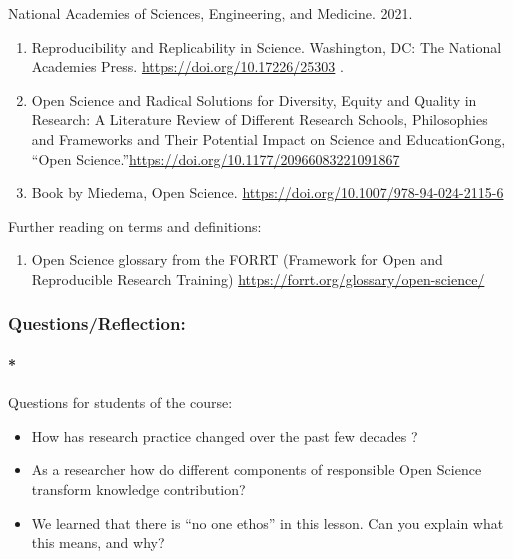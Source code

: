 \documentclass[
  letterpaper,
  DIV=11,
  numbers=noendperiod]{scrreport}
\let\oldparagraph\paragraph
\renewcommand{\paragraph}[1]{\oldparagraph{#1}\mbox{}}
\providecommand{\tightlist}{%
  \setlength{\itemsep}{0pt}\setlength{\parskip}{0pt}}\usepackage{longtable,booktabs,array}
\begin{document}
National Academies of Sciences, Engineering, and Medicine. 2021.

\begin{enumerate}
\def\labelenumi{\arabic{enumi}.}
\tightlist
\item
  Reproducibility and Replicability in Science. Washington, DC: The
  National Academies Press. \url{https://doi.org/10.17226/25303} .
\item
  Open Science and Radical Solutions for Diversity, Equity and Quality
  in Research: A Literature Review of Different Research Schools,
  Philosophies and Frameworks and Their Potential Impact on Science and
  EducationGong, ``Open
  Science.''\url{https://doi.org/10.1177/20966083221091867}
\item
  Book by Miedema, Open Science.
  \url{https://doi.org/10.1007/978-94-024-2115-6}
\end{enumerate}

Further reading on terms and definitions:

\begin{enumerate}
\def\labelenumi{\arabic{enumi}.}
\tightlist
\item
  Open Science glossary from the FORRT (Framework for Open and
  Reproducible Research Training)
  \url{https://forrt.org/glossary/open-science/}
\end{enumerate}

\hypertarget{questionsreflection}{%
\subsubsection*{Questions/Reflection:}\label{questionsreflection}}

\hypertarget{questions-for-students-of-the-course}{%
\paragraph*{Questions for students of the
course:}\label{questions-for-students-of-the-course}}

\begin{itemize}
\tightlist
\item
  How has research practice changed over the past few decades ?
\item
  As a researcher how do different components of responsible Open
  Science transform knowledge contribution?
\item
  We learned that there is ``no one ethos'' in this lesson. Can you
  explain what this means, and why?
\end{itemize}
\end{document}
